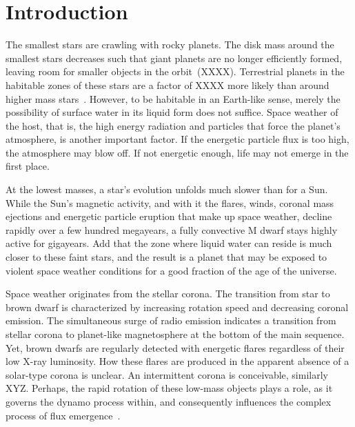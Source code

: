 \documentclass[twocolumn]{aastex631}
\begin{document}
\section{Introduction}
\label{sec:intro}
The smallest stars are crawling with rocky planets. The disk mass around the smallest stars decreases such that giant planets are no longer efficiently formed, leaving room for smaller objects in the orbit~(XXXX). Terrestrial planets in the habitable zones of these stars are a factor of XXXX more likely than around higher mass stars~\citep{hardegree-ullman2019kepler}. However, to be habitable in an Earth-like sense, merely the possibility of surface water in its liquid form does not suffice. Space weather of the host, that is, the high energy radiation and particles that force the planet's atmosphere, is another important factor. If the energetic particle flux is too high, the atmosphere may blow off. If not energetic enough, life may not emerge in the first place.

At the lowest masses, a star's evolution unfolds much slower than for a Sun. While the Sun's magnetic activity, and with it the flares, winds, coronal mass ejections and energetic particle eruption that make up space weather, decline rapidly over a few hundred megayears, a fully convective M dwarf stays highly active for gigayears. Add that the zone where liquid water can reside is much closer to these faint stars, and the result is a planet that may be exposed to violent space weather conditions for a good fraction of the age of the universe. 

Space weather originates from the stellar corona. The transition from star to brown dwarf is characterized by increasing rotation speed and decreasing coronal emission. The simultaneous surge of radio emission indicates a transition from stellar corona to planet-like magnetosphere at the bottom of the main sequence. Yet, brown dwarfs are regularly detected with energetic flares regardless of their low X-ray luminosity. How these flares are produced in the apparent absence of a solar-type corona is unclear. An intermittent corona is conceivable, similarly XYZ. Perhaps, the rapid rotation of these low-mass objects plays a role, as it governs the dynamo process within, and consequently influences the complex process of flux emergence~\citep{weber2023understanding}.   
\end{document}
